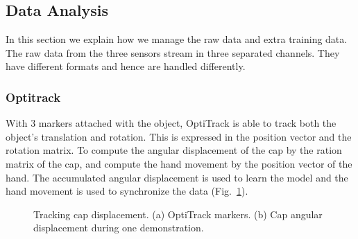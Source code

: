 \documentclass[preprint,12pt]{elsarticle}
\begin{document}
\subsection{Data Analysis}
\label{dataanalysis}
In this section we explain how we manage the raw data and extra training data.
The raw data from the three sensors stream in three separated channels. They have different formats and hence are handled differently.

\subsubsection{Optitrack}
\label{sec:optiktrack}
With 3 markers attached with the object, OptiTrack is able to track both the object's translation and rotation. This is expressed in the position vector and the rotation matrix. To compute the angular displacement of the cap by the ration matrix of the cap, and compute the hand movement by the position vector of the hand. The accumulated angular displacement is used to learn the model and the hand movement is used to synchronize the data (Fig.~\ref{fig:optitrack}).

\begin{figure}
  \centering
  \hspace{0.5cm}
  \caption{ \scriptsize{Tracking cap displacement. (a) OptiTrack markers. (b) Cap angular displacement during one demonstration. }
  \label{fig:optitrack}
}
\end{figure}
\end{document}
